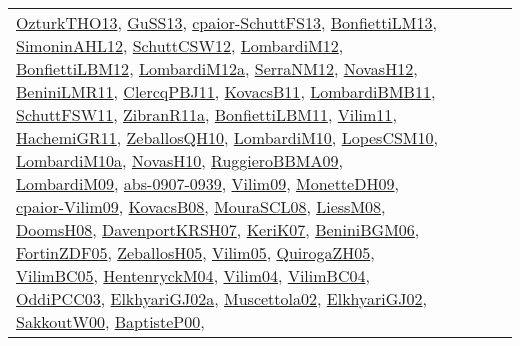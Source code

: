 {\begin{longtable}{lp{3cm}>{\raggedright}p{6cm}>{\raggedright}p{6cm}p{8cm}}
\href{articles/OzturkTHO13.pdf}{OzturkTHO13}\cite{OzturkTHO13}, \href{papers/GuSS13.pdf}{GuSS13}\cite{GuSS13}, \href{papers/cpaior-SchuttFS13.pdf}{cpaior-SchuttFS13}\cite{cpaior-SchuttFS13}, \href{papers/BonfiettiLM13.pdf}{BonfiettiLM13}\cite{BonfiettiLM13}, \href{papers/SimoninAHL12.pdf}{SimoninAHL12}\cite{SimoninAHL12}, \href{papers/SchuttCSW12.pdf}{SchuttCSW12}\cite{SchuttCSW12}, \href{articles/LombardiM12.pdf}{LombardiM12}\cite{LombardiM12}, \href{papers/BonfiettiLBM12.pdf}{BonfiettiLBM12}\cite{BonfiettiLBM12}, \href{articles/LombardiM12a.pdf}{LombardiM12a}\cite{LombardiM12a}, \href{papers/SerraNM12.pdf}{SerraNM12}\cite{SerraNM12}, \href{articles/NovasH12.pdf}{NovasH12}\cite{NovasH12}, \href{articles/BeniniLMR11.pdf}{BeniniLMR11}\cite{BeniniLMR11}, \href{papers/ClercqPBJ11.pdf}{ClercqPBJ11}\cite{ClercqPBJ11}, \href{articles/KovacsB11.pdf}{KovacsB11}\cite{KovacsB11}, \href{papers/LombardiBMB11.pdf}{LombardiBMB11}\cite{LombardiBMB11}, \href{articles/SchuttFSW11.pdf}{SchuttFSW11}\cite{SchuttFSW11}, \href{papers/ZibranR11a.pdf}{ZibranR11a}\cite{ZibranR11a}, \href{papers/BonfiettiLBM11.pdf}{BonfiettiLBM11}\cite{BonfiettiLBM11}, \href{papers/Vilim11.pdf}{Vilim11}\cite{Vilim11}, \href{articles/HachemiGR11.pdf}{HachemiGR11}\cite{HachemiGR11}, \href{articles/ZeballosQH10.pdf}{ZeballosQH10}\cite{ZeballosQH10}, \href{papers/LombardiM10.pdf}{LombardiM10}\cite{LombardiM10}, \href{articles/LopesCSM10.pdf}{LopesCSM10}\cite{LopesCSM10}, \href{articles/LombardiM10a.pdf}{LombardiM10a}\cite{LombardiM10a}, \href{articles/NovasH10.pdf}{NovasH10}\cite{NovasH10}, \href{articles/RuggieroBBMA09.pdf}{RuggieroBBMA09}\cite{RuggieroBBMA09}, \href{papers/LombardiM09.pdf}{LombardiM09}\cite{LombardiM09}, \href{articles/abs-0907-0939.pdf}{abs-0907-0939}\cite{abs-0907-0939}, \href{papers/Vilim09.pdf}{Vilim09}\cite{Vilim09}, \href{papers/MonetteDH09.pdf}{MonetteDH09}\cite{MonetteDH09}, \href{papers/cpaior-Vilim09.pdf}{cpaior-Vilim09}\cite{cpaior-Vilim09}, \href{articles/KovacsB08.pdf}{KovacsB08}\cite{KovacsB08}, \href{papers/MouraSCL08.pdf}{MouraSCL08}\cite{MouraSCL08}, \href{articles/LiessM08.pdf}{LiessM08}\cite{LiessM08}, \href{papers/DoomsH08.pdf}{DoomsH08}\cite{DoomsH08}, \href{papers/DavenportKRSH07.pdf}{DavenportKRSH07}\cite{DavenportKRSH07}, \href{papers/KeriK07.pdf}{KeriK07}\cite{KeriK07}, \href{papers/BeniniBGM06.pdf}{BeniniBGM06}\cite{BeniniBGM06}, \href{papers/FortinZDF05.pdf}{FortinZDF05}\cite{FortinZDF05}, \href{articles/ZeballosH05.pdf}{ZeballosH05}\cite{ZeballosH05}, \href{papers/Vilim05.pdf}{Vilim05}\cite{Vilim05}, \href{papers/QuirogaZH05.pdf}{QuirogaZH05}\cite{QuirogaZH05}, \href{articles/VilimBC05.pdf}{VilimBC05}\cite{VilimBC05}, \href{papers/HentenryckM04.pdf}{HentenryckM04}\cite{HentenryckM04}, \href{papers/Vilim04.pdf}{Vilim04}\cite{Vilim04}, \href{papers/VilimBC04.pdf}{VilimBC04}\cite{VilimBC04}, \href{papers/OddiPCC03.pdf}{OddiPCC03}\cite{OddiPCC03}, \href{papers/ElkhyariGJ02a.pdf}{ElkhyariGJ02a}\cite{ElkhyariGJ02a}, \href{papers/Muscettola02.pdf}{Muscettola02}\cite{Muscettola02}, \href{papers/ElkhyariGJ02.pdf}{ElkhyariGJ02}\cite{ElkhyariGJ02}, \href{articles/SakkoutW00.pdf}{SakkoutW00}\cite{SakkoutW00}, \href{articles/BaptisteP00.pdf}{BaptisteP00}\cite{BaptisteP00}, 
\end{longtable}}
